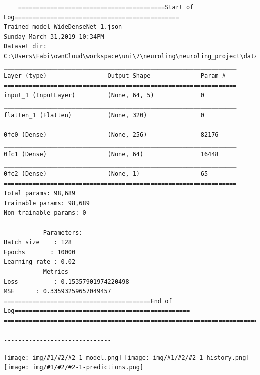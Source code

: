 \documentclass[a4paper]{report}
\newcommand{\net}[3]{
\texttt{[image: img/\#1/\#2/\#2-1-model.png]}
\texttt{[image: img/\#1/\#2/\#2-1-history.png]}
\texttt{[image: img/\#1/\#2/\#2-1-predictions.png]}}
\begin{document}
\begin{lstlisting}
    =========================================Start of Log==============================================
Trained model WideDenseNet-1.json
Sunday March 31,2019 10:34PM
Dataset dir: C:\Users\Fabi\ownCloud\workspace\uni\7\neuroling\neuroling_project\data\v1
_________________________________________________________________
Layer (type)                 Output Shape              Param #
=================================================================
input_1 (InputLayer)         (None, 64, 5)             0
_________________________________________________________________
flatten_1 (Flatten)          (None, 320)               0
_________________________________________________________________
0fc0 (Dense)                 (None, 256)               82176
_________________________________________________________________
0fc1 (Dense)                 (None, 64)                16448
_________________________________________________________________
0fc2 (Dense)                 (None, 1)                 65
=================================================================
Total params: 98,689
Trainable params: 98,689
Non-trainable params: 0
_________________________________________________________________
___________Parameters:______________
Batch size    : 128
Epochs       : 10000
Learning rate : 0.02
___________Metrics___________________
Loss          : 0.15357901974220498
MSE      : 0.33593259657049457
=========================================End of Log=================================================
====================================================================================================
----------------------------------------------------------------------------------------------------

\end{lstlisting}
\net{5}{WideDenseNet}{log}
\end{document}
